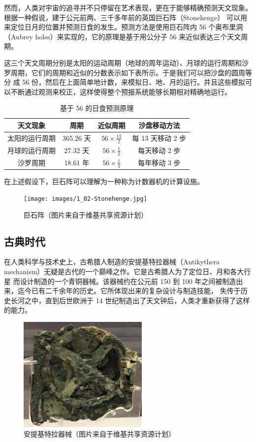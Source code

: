 \documentclass[a4paper,10.5pt]{book}
\begin{document}
然而，人类对宇宙的追寻并不只停留在艺术表现，更在于能够精确预测天文现象。根据一种假说，建于公元前两、三千多年前的英国巨石阵（Stonehenge）
可以用来定位日月的位置并预测日食的发生。预测方法是使用巨石阵内 56 个奥布里洞（Aubrey holes）来实现的，它的原理是基于用公分子 56 来近似表达三个天文周期。

这三个天文周期分别是太阳的运动周期（地球的周年运动）、月球的运行周期和沙罗周期，它们的周期和近似的分数表示如下表所示。于是我们可以把沙盘的圆周等分
成 56 份，然后在上面简单地计数，来模拟日、地、月的运行。并且这些模拟可以不断通过观测来校正，这样使得整个预报系统能够长期相对精确地运行。\cite{beggs2012unifying}

\begin{table}[tbhp]
\centering
\begin{tabular}{|c|c|c|c|}
\hline
天文现象 & 周期 & 近似周期 & 沙盘移动方法 \\
\hline
太阳的运行周期 & 365.26 天 & $ 56 \times \frac{13}{2} $ & 每 13 天移动 2 步 \\
\hline
月球的运行周期 & 27.32 天 & $ 56 \times \frac{1}{2} $  & 每天移动 2 步 \\
\hline
沙罗周期 & 18.61 年 & $ 56 \times \frac{1}{3} $  & 每年移动 3 步 \\
\hline
\end{tabular}
\caption{基于 56 的日食预测原理}
\end{table}

在上述假设下，巨石阵可以理解为一种称为计数器机\cite{beggs2012unifying}的计算设施。

\begin{figure}[ht]
\centering
\texttt{[image: images/1\_02-Stonehenge.jpg]}
\caption{巨石阵（图片来自于维基共享资源计划）}
\end{figure}

\subsection{古典时代}

在人类科学与技术史上，古希腊人制造的安提基特拉器械（Antikythera mechanism）无疑是古代的一个巅峰之作。它是古希腊人为了定位日、月和各大行星
而设计制造的一个青铜器械。该器械约在公元前 150 到 100 年之间被制造出来，迄今已有二千余年的历史。它所体现出来的复杂设计与制造技能，
失传于历史长河之中，直到后世欧洲于 14 世纪制造出了天文钟后，人类才重新获得了这样的能力。

\begin{figure}[ht]
\centering
\includegraphics[width=2.5in]{images/1_03-Antikythera.jpg}
\caption{安提基特拉器械（图片来自于维基共享资源计划）}
\end{figure}
\end{document}
